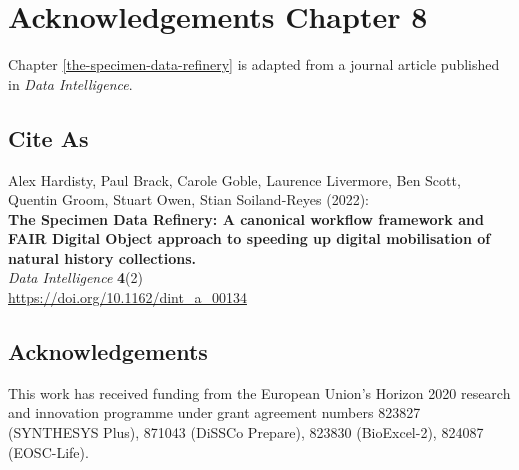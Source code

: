 
\section{Acknowledgements Chapter 8}

Chapter \vref{the-specimen-data-refinery} is adapted from a journal article published in \emph{Data Intelligence}.

\subsection*{Cite As}

Alex Hardisty, Paul Brack, Carole Goble, Laurence Livermore, Ben Scott,
Quentin Groom, Stuart Owen, Stian Soiland-Reyes (2022):\\
\textbf{The Specimen Data Refinery: A canonical workflow framework and
FAIR Digital Object approach to speeding up digital mobilisation of
natural history collections.}\\
\emph{Data Intelligence} \textbf{4}(2)\\
\url{https://doi.org/10.1162/dint_a_00134}


\subsection*{Acknowledgements}

This work has received funding from the European Union's Horizon 2020
research and innovation programme under grant agreement numbers 823827
(SYNTHESYS Plus), 871043 (DiSSCo Prepare), 823830 (BioExcel-2), 824087
(EOSC-Life).



